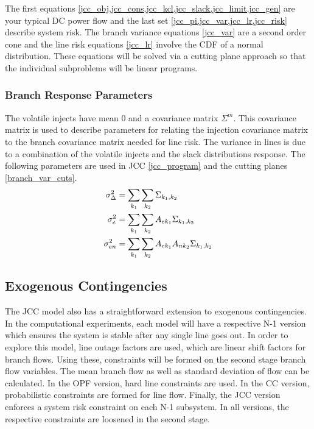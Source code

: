 The first equations \cref{jcc_obj,jcc_cons,jcc_kcl,jcc_slack,jcc_limit,jcc_gen} are your typical DC power flow and the last set \cref{jcc_pi,jcc_var,jcc_lr,jcc_risk} describe system risk.  The branch variance equations \ref{jcc_var} are a second order cone and the line risk equations \ref{jcc_lr} involve the CDF of a normal distribution.  These equations will be solved via a cutting plane approach so that the individual subproblems will be linear programs.


\subsubsection*{Branch Response Parameters}
The volatile injects have mean 0 and a covariance matrix $\Sigma^m$.  This covariance matrix is used to describe parameters for relating the injection covariance matrix to the branch covariance matrix needed for line risk.  The variance in lines is due to a combination of the volatile injects and the slack distributions response.  The following parameters are used in JCC \ref{jcc_program} and the cutting planes \ref{branch_var_cuts}.
\begin{subequations}
\begin{align}
 \sigma_\Delta^2 &= \sum_{k_1} \sum_{k_2} \Sigma_{k_1,k_2}  \\
 \sigma_e^2 &= \sum_{k_1} \sum_{k_2} A_{ek_1} \Sigma_{k_1,k_2} \\
 \sigma_{en}^2 &= \sum_{k_1} \sum_{k_2} A_{ek_1} A_{nk_2} \Sigma_{k_1,k_2}
\end{align}
\end{subequations}


\subsection{Exogenous Contingencies}
The JCC model also has a straightforward extension to exogenous contingencies.  In the computational experiments, each model will have a respective N-1 version which ensures the system is stable after any single line goes out.  In order to explore this model, line outage factors are used, which are linear shift factors for branch flows.  Using these, constraints will be formed on the second stage branch flow variables.  The mean branch flow as well as standard deviation of flow can be calculated.  In the OPF version, hard line constraints are used.  In the CC version, probabilistic constraints are formed for line flow.  Finally, the JCC version enforces a system risk constraint on each N-1 subsystem.  In all versions, the respective constraints are loosened in the second stage.


